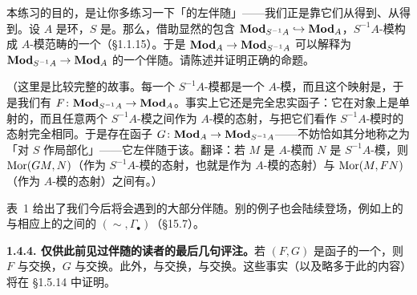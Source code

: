\begin{exercise}\label{ex:localization-forgetful-adjoint}
本练习的目的，是让你多练习一下「\trForgetfulFunctor{}的左伴随」——我们正是靠它们从\trAbelianSemigroup{}得到\trAbelianGroups、从\trPresheaf{}得到\trSheaf。设 $A$ 是环，$S$ 是\trMultiplicativeSubset。那么，借助显然的包含 $\mathbf{Mod}_{S^{-1}A}\hookrightarrow\mathbf{Mod}_{A}$，$S^{-1}A$-模构成 $A$-模范畴的一个\trFullSubcategory{}（\S1.1.15）。于是 $\mathbf{Mod}_{A}\to\mathbf{Mod}_{S^{-1}A}$ 可以解释为\trForgetfulFunctor{} $\mathbf{Mod}_{S^{-1}A}\to\mathbf{Mod}_{A}$ 的一个伴随。请陈述并证明正确的命题。

（这里是比较完整的故事。每一个 $S^{-1}A$-模都是一个 $A$-模，而且这个映射是\trInjectiveMap，于是我们有\trForgetfulFunctor{} $F\colon\mathbf{Mod}_{S^{-1}A}\to\mathbf{Mod}_{A}$。事实上它还是完全忠实函子：它在对象上是单射的，而且任意两个 $S^{-1}A$-模之间作为 $A$-模的态射，与把它们看作 $S^{-1}A$-模时的态射完全相同。于是存在函子 $G\colon\mathbf{Mod}_{A}\to\mathbf{Mod}_{S^{-1}A}$——不妨恰如其分地称之为「对 $S$ 作局部化」——它左伴随于该\trForgetfulFunctor。翻译：若 $M$ 是 $A$-模而 $N$ 是 $S^{-1}A$-模，则 $\operatorname{Mor}(GM,N)$（作为 $S^{-1}A$-模的态射，也就是作为 $A$-模的态射）与 $\operatorname{Mor}(M,FN)$（作为 $A$-模的态射）之间有\trNatural\trBijection。）
\end{exercise}

表~1 给出了我们今后将会遇到的大部分伴随。别的例子也会陆续登场，例如\trGradedRing{}上的\trGradedModule{}与相应\trProjectiveScheme{}上的\trQCSheaf{}之间的\trAdjointPair{} $(\sim,\Gamma_\bullet)$（\S15.7）。

\textbf{1.4.4. 仅供此前见过伴随的读者的最后几句评注。}\quad 若 $(F,G)$ 是函子的一个\trAdjointPair，则 $F$ 与\trColimit{}交换，$G$ 与\trLimit{}交换。此外，\trLimit{}与\trLimit{}交换，\trColimit{}与\trColimit{}交换。这些事实（以及略多于此的内容）将在 \S1.5.14 中证明。

